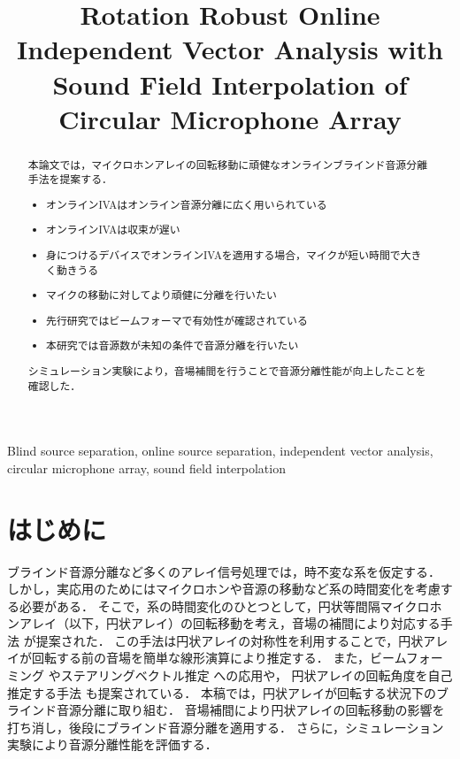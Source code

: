 \documentclass{article}
\title{Rotation Robust Online Independent Vector Analysis with\\Sound Field Interpolation of Circular Microphone Array}
\begin{document}
\maketitle

\begin{abstract}
  本論文では，マイクロホンアレイの回転移動に頑健なオンラインブラインド音源分離手法を提案する．
  \begin{itemize}
    \item オンラインIVAはオンライン音源分離に広く用いられている
    \item オンラインIVAは収束が遅い
    \item 身につけるデバイスでオンラインIVAを適用する場合，マイクが短い時間で大きく動きうる
    \item マイクの移動に対してより頑健に分離を行いたい
    \item 先行研究ではビームフォーマで有効性が確認されている
    \item 本研究では音源数が未知の条件で音源分離を行いたい
\end{itemize}
  シミュレーション実験により，音場補間を行うことで音源分離性能が向上したことを確認した．
\end{abstract}
\begin{keywords}
  Blind source separation,
  online source separation,
  independent vector analysis,
  circular microphone array,
  sound field interpolation
\end{keywords}

\section{はじめに}
ブラインド音源分離など多くのアレイ信号処理では，時不変な系を仮定する．
しかし，実応用のためにはマイクロホンや音源の移動など系の時間変化を考慮する必要がある．
そこで，系の時間変化のひとつとして，円状等間隔マイクロホンアレイ（以下，円状アレイ）の回転移動を考え，音場の補間により対応する手法 \cite{Wakabayashi:2020:ASJ:A} が提案された．
この手法は円状アレイの対称性を利用することで，円状アレイが回転する前の音場を簡単な線形演算により推定する．
また，ビームフォーミング \cite{Wakabayashi:2021:ICASSP} やステアリングベクトル推定 \cite{Wakabayashi:2021:ASJ:A} への応用や，
円状アレイの回転角度を自己推定する手法 \cite{Lian:2021:APSIPA} も提案されている．
本稿では，円状アレイが回転する状況下のブラインド音源分離に取り組む．
音場補間により円状アレイの回転移動の影響を打ち消し，後段にブラインド音源分離を適用する．
さらに，シミュレーション実験により音源分離性能を評価する．
\end{document}
